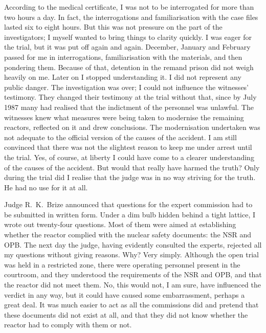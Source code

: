 \documentclass[openright]{bookest}
\begin{document}
According to the medical certificate, I was not to be interrogated for more than two hours a day. In fact, the interrogations and familiarisation with the case files lasted six to eight hours. But this was not pressure on the part of the investigators; I myself wanted to bring things to clarity quickly. I was eager for the trial, but it was put off again and again. December, January and February passed for me in interrogations, familiarisation with the materials, and then pondering them. Because of that, detention in the remand prison did not weigh heavily on me. Later on I stopped understanding it. I did not represent any public danger. The investigation was over; I could not influence the witnesses' testimony. They changed their testimony at the trial without that, since by July 1987 many had realised that the indictment of the personnel was unlawful. The witnesses knew what measures were being taken to modernise the remaining reactors, reflected on it and drew conclusions. The modernisation undertaken was not adequate to the official version of the causes of the accident. I am still convinced that there was not the slightest reason to keep me under arrest until the trial. Yes, of course, at liberty I could have come to a clearer understanding of the causes of the accident. But would that really have harmed the truth? Only during the trial did I realise that the judge was in no way striving for the truth. He had no use for it at all.

Judge R.~K.~Brize announced that questions for the expert commission had to be submitted in written form. Under a dim bulb hidden behind a tight lattice, I wrote out twenty-four questions. Most of them were aimed at establishing whether the reactor complied with the nuclear safety documents: the NSR and OPB. The next day the judge, having evidently consulted the experts, rejected all my questions without giving reasons. Why? Very simply. Although the open trial was held in a restricted zone, there were operating personnel present in the courtroom, and they understood the requirements of the NSR and OPB, and that the reactor did not meet them. No, this would not, I am sure, have influenced the verdict in any way, but it could have caused some embarrassment, perhaps a great deal. It was much easier to act as all the commissions did and pretend that these documents did not exist at all, and that they did not know whether the reactor had to comply with them or not.

\end{document}
